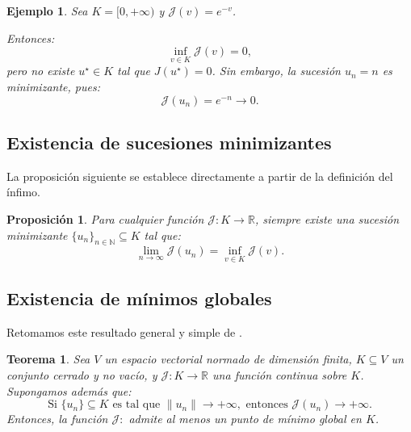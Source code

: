 \documentclass[12pt]{book}
\newtheorem{theorem}{Teorema}
\newtheorem{proposition}{Proposición}
\newtheorem{ex}{Ejemplo}
\theoremstyle{definition}
\theoremstyle{plain}
\theoremstyle{remark}
\begin{document}
\begin{ex}
Sea $K = [0, +\infty)$ y $\mathcal{J}(v) = e^{-v}$.

\medskip

Entonces:
\[
\inf_{v \in K} \mathcal{J}(v) = 0,
\]
pero no existe $u^\star \in K$ tal que $J(u^\star) = 0$. Sin embargo, la sucesión $u_n = n$ es minimizante, pues:
\[
\mathcal{J}(u_n) = e^{-n} \to 0.
\]
\end{ex}

\subsection{Existencia %
de sucesiones minimizantes}

La proposición siguiente se establece directamente a partir de la definición del ínfimo.

\begin{proposition}
Para cualquier función $\mathcal{J}: K \to \mathbb{R}$, %
siempre existe una {sucesión minimizante} $\{u_n\}_{n \in \mathbb{N}} \subseteq K$ tal que:
\[
\lim_{n \to \infty} \mathcal{J}(u_n) = \inf_{v \in K} \mathcal{J}(v).
\]
\end{proposition}

\subsection{Existencia de mínimos globales}

Retomamos este resultado general y simple de \cite{allaire2007}.

\begin{theorem}
Sea $V$ un espacio vectorial normado de \emph{dimensión finita}, $K \subseteq V$ un conjunto \emph{cerrado y no vacío}, y $\mathcal{J}: K \to \mathbb{R}$ una función \emph{continua} sobre $K$. Supongamos además que:
\begin{equation}
\label{eq:coercividad}
\text{Si } \{u_n\} \subseteq K \text{ es tal que } \|u_n\| \to +\infty, \text{ entonces } \mathcal{J}(u_n) \to +\infty.
\end{equation}
Entonces, la función $\mathcal{J}:$ admite al menos un \emph{punto de mínimo global} en $K$.
\end{theorem}
\end{document}
